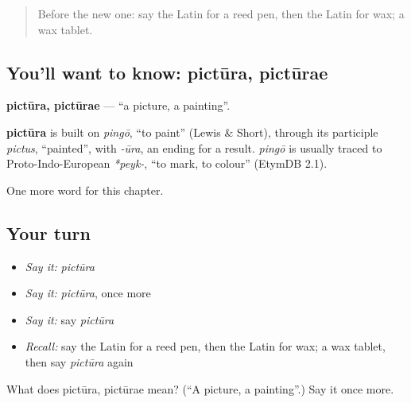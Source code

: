 \label{lesson:LA-C124-pictura}



\begin{quote}
Before the new one: say the Latin for a reed pen, then the Latin for wax; a wax tablet.
\end{quote}

\subsection*{You'll want to know: pictūra, pictūrae}
\textbf{pictūra, pictūrae} — \textquotedblleft{}a picture, a painting\textquotedblright{}.

\begin{cousinweb}
\textbf{pictūra} is built on \emph{pingō}, \textquotedblleft{}to paint\textquotedblright{} (Lewis \& Short), through its participle \emph{pictus}, \textquotedblleft{}painted\textquotedblright{}, with \emph{-ūra}, an ending for a result. \emph{pingō} is usually traced to Proto-Indo-European \emph{*peyk-}, \textquotedblleft{}to mark, to colour\textquotedblright{} (EtymDB 2.1).
\end{cousinweb}

\begin{grammarlens}[title={What you've built}]
One more word for this chapter.
\end{grammarlens}

\subsection*{Your turn}
\begin{itemize}
\raggedright
  \item \emph{Say it:} \emph{pictūra}
  \item \emph{Say it:} \emph{pictūra}, once more
  \item \emph{Say it:} say \emph{pictūra}
  \item \emph{Recall:} say the Latin for a reed pen, then the Latin for wax; a wax tablet, then say \emph{pictūra} again
\end{itemize}

\begin{tcolorbox}[breakable,colback=teal!4,colframe=teal!35!black,title={Before you move on}]
What does pictūra, pictūrae mean? (\textquotedblleft{}A picture, a painting\textquotedblright{}.) Say it once more.
\end{tcolorbox}
